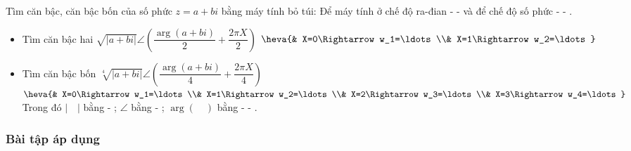 \begin{note}
	Tìm căn bậc, căn bậc bốn của số phức $z=a+bi$ bằng máy tính bỏ túi: Để máy tính ở chế độ ra-đian  -  -  và để chế độ số phức  -  - .
	\begin{itemize}
		\item Tìm căn bậc hai $\sqrt{|a+bi|}\angle\left(\dfrac{\arg(a+bi)}{2}+\dfrac{2\pi X}{2}\right)$  $\heva{& X=0\Rightarrow w_1=\ldots\\& X=1\Rightarrow w_2=\ldots}$
		\item Tìm căn bậc bốn $\sqrt[4]{|a+bi|}\angle\left(\dfrac{\arg(a+bi)}{4}+\dfrac{2\pi X}{4}\right)$  
		$\heva{& X=0\Rightarrow w_1=\ldots\\& X=1\Rightarrow w_2=\ldots\\& X=2\Rightarrow w_3=\ldots\\& X=3\Rightarrow w_4=\ldots}$\\
		Trong đó $|\quad |$ bằng  - ; $\angle$ bằng  - \fbox{$(-)$}; $\arg(\quad)$ bằng  -  - .
	\end{itemize}
\end{note}

\subsubsection{Bài tập áp dụng}

